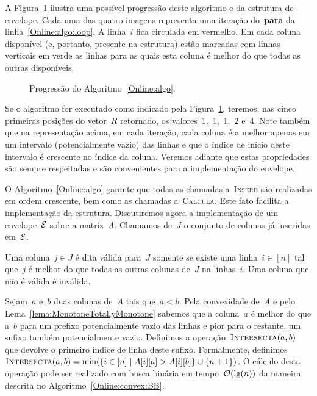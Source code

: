 A Figura~\ref{Online:progress:fig} ilustra uma possível progressão deste algoritmo e da estrutura de envelope. Cada uma das quatro imagens representa uma iteração do~\textbf{para} da linha~\ref{Online:algo:loop}. A linha~$i$ fica circulada em vermelho. Em cada coluna disponível (e, portanto, presente na estrutura) estão marcadas com linhas verticais em verde as linhas para as quais esta coluna é melhor do que todas as outras disponíveis.

\begin{figure}[h]
    \centering
    
    \caption{Progressão do Algoritmo~\ref{Online:algo}.} \label{Online:progress:fig}
\end{figure}

Se o algoritmo for executado como indicado pela Figura~\ref{Online:progress:fig}, teremos, nas cinco primeiras posições do vetor~$R$ retornado, os valores~$1$,~$1$,~$1$,~$2$ e~$4$. Note também que na representação acima, em cada iteração, cada coluna é a melhor apenas em um intervalo (potencialmente vazio) das linhas e que o índice de início deste intervalo é crescente no índice da coluna. Veremos adiante que estas propriedades são sempre respeitadas e são convenientes para a implementação do envelope.

O Algoritmo~\ref{Online:algo} garante que todas as chamadas a~\textsc{Insere} são realizadas em ordem crescente, bem como as chamadas a~\textsc{Calcula}. Este fato facilita a implementação da estrutura. Discutiremos agora a implementação de um envelope~$\mathcal{E}$ sobre a matriz~$A$. Chamamos de~$J$ o conjunto de colunas já inseridas em~$\mathcal{E}$.

\begin{defi}
Uma coluna~${ j \in J }$ é dita válida para~$J$ somente se existe uma linha~${ i \in [n] }$ tal que~$j$ é melhor do que todas as outras colunas de~$J$ na linhas~$i$. Uma coluna que não é válida é inválida.
\end{defi}

Sejam~$a$ e~$b$ duas colunas de~$A$ tais que~$a < b$. Pela convexidade de~$A$ e pelo Lema~\ref{lema:MonotoneTotallyMonotone} sabemos que a coluna~$a$ é melhor do que a~$b$ para um prefixo potencialmente vazio das linhas e pior para o restante, um sufixo também potencialmente vazio. Definimos a operação~$\textsc{Intersecta}(a,b)$ que devolve o primeiro índice de linha deste sufixo. Formalmente, definimos~${\textsc{Intersecta}(a,b) = \min(\{ i \in [n] \mid A[i][a] > A[i][b] \} \cup \{n+1\})}$. O cálculo desta operação pode ser realizado com busca binária em tempo~$\mathcal{O}(\lg(n))$ da maneira descrita no Algoritmo~\ref{Online:convex:BB}. 

